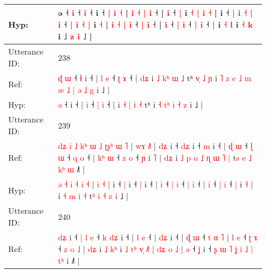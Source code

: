 \documentclass[10pt]{article}
\DeclareRobustCommand{\hl}[1]{{\textcolor{red}{#1}}}
\begin{document}
\begin{longtable}{ll}
 \\
Hyp: & ə ˧\hl{}\hl{}\hl{} \hl{}\hl{i} ˧\hl{}\hl{} \hl{i} ˧\hl{}\hl{}\hl{}\hl{}\hl{} i ˧ \hl{}\hl{}\hl{|} \hl{i} \hl{˧} | \hl{}\hl{}\hl{}\hl{i} \hl{˧} \hl{|} \hl{}\hl{i} ˧\hl{} |\hl{}\hl{}\hl{}\hl{} \hl{i} ˧ \hl{}\hl{|} i \hl{˧} \hl{|} \hl{i} \hl{˧} |\hl{}\hl{}\hl{} i ˧ \hl{}\hl{}\hl{|} \hl{i} \hl{˧} \hl{|} \hl{i} ˧ \hl{|} \hl{}\hl{i} \hl{˧} \hl{|} i \hl{˧} | \hl{}\hl{i} \hl{˧} \hl{}\hl{}\hl{|} \hl{i} ˧ \hl{}\hl{}\hl{|} \hl{i} ˧\hl{} | \hl{}\hl{i} ˧ \hl{}\hl{}\hl{|} \hl{i} ˧ \hl{|} \hl{i} ˧ \hl{|} i \hl{˧} \hl{l} i \hl{˧} \hl{}\hl{k} i ˩ \hl{z} \hl{}\hl{i} ˩ |
 \\
\midrule
Utterance ID: & 238 \\
Ref: & \hl{ɖ}\hl{ }\hl{ɯ} ˧\hl{ }\hl{ɬ} i ˧ |\hl{ }\hl{l} \hl{e} ˧ \hl{ʈ} \hl{ɤ} ˧ |\hl{ }\hl{d}\hl{ʑ} i \hl{˩} \hl{k}\hl{ʰ} \hl{ɯ} \hl{˩} tʰ\hl{ }\hl{v}\hl{̩}\hl{ }\hl{˩}\hl{ }\hl{ɲ} i\hl{ }\hl{˥}\hl{ }\hl{z}\hl{ }\hl{e}\hl{ }\hl{˩}\hl{ }\hl{m} \hl{æ} \hl{˩}\hl{ }\hl{|} \hl{ə} \hl{˩} \hl{g} i ˩ |
 \\
Hyp: & \hl{}\hl{}\hl{ə} ˧\hl{}\hl{} i ˧ |\hl{}\hl{} \hl{i} ˧ \hl{|} \hl{i} ˧ |\hl{}\hl{}\hl{} i \hl{˧} \hl{}\hl{|} \hl{i} \hl{˧} tʰ\hl{}\hl{}\hl{}\hl{}\hl{}\hl{}\hl{} i\hl{}\hl{}\hl{}\hl{}\hl{}\hl{}\hl{}\hl{}\hl{}\hl{} \hl{˧} \hl{}\hl{t}\hl{ʰ} \hl{i} \hl{˧} \hl{z} i ˩ |
 \\
\midrule
Utterance ID: & 239 \\
Ref: & \hl{d}\hl{ʑ}\hl{ }\hl{i}\hl{ }\hl{˩}\hl{ }\hl{k}\hl{ʰ} \hl{ɯ} \hl{˩} \hl{ʈ}\hl{ʂ}\hl{ʰ} \hl{ɯ} \hl{˥} | \hl{w}\hl{ɤ} \hl{˩}\hl{˥} |\hl{ }\hl{d}\hl{ʑ} i ˧ \hl{d}\hl{ʑ} i ˧ \hl{m} i ˧ |\hl{ }\hl{ɖ} \hl{ɯ} ˧ \hl{ɭ} \hl{ɯ} ˧ \hl{q} \hl{o} ˧ |\hl{ }\hl{k}\hl{ʰ} \hl{ɯ} ˧ \hl{z} \hl{o} ˧ \hl{ɲ} i \hl{˥} |\hl{ }\hl{d}\hl{ʑ} i\hl{ }\hl{˩}\hl{ }\hl{p}\hl{ }\hl{o}\hl{ }\hl{˩} \hl{ɳ} \hl{ɯ} \hl{˥} \hl{|} t\hl{s} \hl{e} \hl{˩} \hl{k}\hl{ʰ} \hl{ɯ} ˩\hl{˥} |
 \\
Hyp: & \hl{}\hl{}\hl{}\hl{}\hl{}\hl{}\hl{}\hl{}\hl{ə} \hl{˧} \hl{i} \hl{}\hl{}\hl{˧} \hl{i} \hl{˧} | \hl{}\hl{i} \hl{}\hl{˧} |\hl{}\hl{}\hl{} i ˧ \hl{}\hl{|} i ˧ \hl{|} i ˧ |\hl{}\hl{} \hl{i} ˧ \hl{|} \hl{i} ˧ \hl{|} \hl{i} ˧ |\hl{}\hl{}\hl{} \hl{i} ˧ \hl{|} \hl{i} ˧ \hl{|} i \hl{˧} |\hl{}\hl{}\hl{} i\hl{}\hl{}\hl{}\hl{}\hl{}\hl{}\hl{}\hl{} \hl{˧} \hl{m} \hl{i} \hl{˧} t\hl{ʰ} \hl{i} \hl{˧} \hl{}\hl{z} \hl{i} ˩\hl{} |
 \\
\midrule
Utterance ID: & 240 \\
Ref: & \hl{}\hl{d}\hl{ʑ} i ˧ \hl{|} \hl{l} \hl{e} ˧\hl{ }\hl{k} \hl{d}\hl{ʑ} i ˧ |\hl{ }\hl{l} \hl{e} ˧ |\hl{ }\hl{d}\hl{ʑ} i ˧ |\hl{ }\hl{ɖ} \hl{ɯ} ˧ \hl{t} \hl{ɑ} \hl{˥} |\hl{ }\hl{l} \hl{e} ˧ \hl{ʈ} \hl{ɤ} ˧ \hl{z} \hl{o} \hl{˩} |\hl{ }\hl{d}\hl{ʑ} i \hl{˩} \hl{k}\hl{ʰ} i \hl{˩} \hl{t}\hl{ʰ} \hl{v}\hl{̩} \hl{˩}\hl{˥} |\hl{ }\hl{d}\hl{ʑ} \hl{o} \hl{˩} | \hl{ə} ˧ \hl{ʝ} i ˧ \hl{ʂ} \hl{ɯ} \hl{˥} \hl{ʝ}\hl{ }\hl{i} \hl{˩} \hl{|} \hl{t}\hl{ʰ} i ˩\hl{˥} |

\end{longtable}
\end{document}
